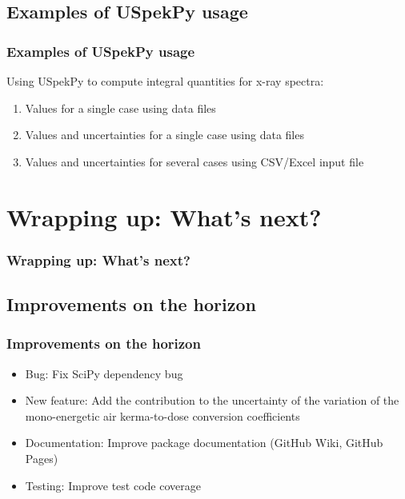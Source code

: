 \documentclass{beamer}
\newcommand{\highlight}[1]{{\color{blue} #1}}
\begin{document}
	\subsection{Examples of USpekPy usage}
	
	\begin{frame}
		\frametitle{Examples of USpekPy usage}
		Using USpekPy to compute integral quantities for x-ray spectra:
		\begin{enumerate}
			\item Values for a single case using data files
			\item Values and uncertainties for a single case using data files
			\item Values and uncertainties for several cases using CSV/Excel input file
		\end{enumerate}
		\bigskip
		\centering
		\href{https://github.com/xandratxan/uspekpy-seminar\#README}{}
	\end{frame}
	
	
	\section{Wrapping up: What’s next?}
		
	\begin{frame}
		\frametitle{Wrapping up: What’s next?}
		\tableofcontents[
		currentsection,
		sectionstyle=show/shaded,
		subsectionstyle=show/show/hide
		]
	\end{frame}
	
	\subsection{Improvements on the horizon}
	
	\begin{frame}
		\frametitle{Improvements on the horizon}
		\begin{itemize}
			\setlength\itemsep{1em}
			\item \highlight{Bug}: Fix SciPy dependency bug
			\item \highlight{New feature}: Add the contribution to the \highlight{uncertainty} of the variation of the mono-energetic air kerma-to-dose conversion coefficients
			\item \highlight{Documentation}: Improve package documentation (GitHub Wiki, GitHub Pages)
			\item \highlight{Testing}: Improve test code coverage
		\end{itemize}			
	\end{frame}
	
\end{document}
